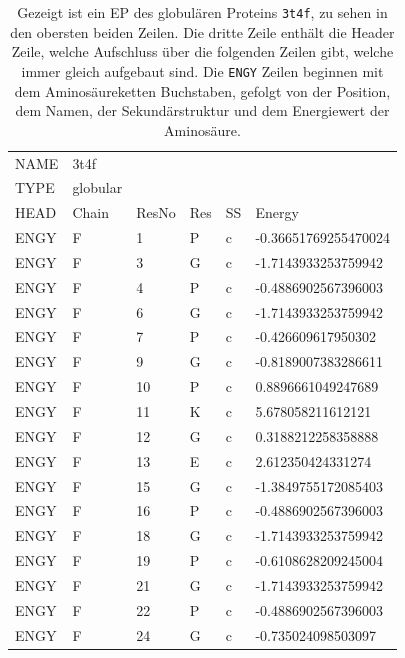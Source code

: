 \begin{table}[]
\centering
\caption{Gezeigt ist ein \ac{EP} des globulären Proteins \texttt{3t4f}, zu sehen in den obersten beiden Zeilen. Die dritte Zeile enthält die Header Zeile, welche Aufschluss über die folgenden Zeilen gibt, welche immer gleich aufgebaut sind. Die \texttt{ENGY} Zeilen beginnen mit dem Aminosäureketten Buchstaben, gefolgt von der Position, dem Namen, der Sekundärstruktur und dem Energiewert der Aminosäure.}
\label{tab:EP}
\begin{tabular}{llllll}
NAME & 3t4f &  &  &  &  \\
TYPE & globular &  &  &  &  \\
HEAD & Chain & ResNo & Res & SS & Energy \\
ENGY & F & 1 & P & c & -0.36651769255470024 \\
ENGY & F & 3 & G & c & -1.7143933253759942 \\
ENGY & F & 4 & P & c & -0.4886902567396003 \\
ENGY & F & 6 & G & c & -1.7143933253759942 \\
ENGY & F & 7 & P & c & -0.426609617950302 \\
ENGY & F & 9 & G & c & -0.8189007383286611 \\
ENGY & F & 10 & P & c & 0.8896661049247689 \\
ENGY & F & 11 & K & c & 5.678058211612121 \\
ENGY & F & 12 & G & c & 0.3188212258358888 \\
ENGY & F & 13 & E & c & 2.612350424331274 \\
ENGY & F & 15 & G & c & -1.3849755172085403 \\
ENGY & F & 16 & P & c & -0.4886902567396003 \\
ENGY & F & 18 & G & c & -1.7143933253759942 \\
ENGY & F & 19 & P & c & -0.6108628209245004 \\
ENGY & F & 21 & G & c & -1.7143933253759942 \\
ENGY & F & 22 & P & c & -0.4886902567396003 \\
ENGY & F & 24 & G & c & -0.735024098503097
\end{tabular}
\end{table}

